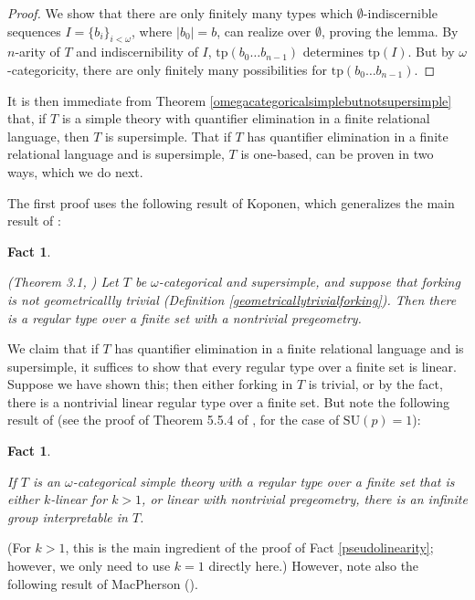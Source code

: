 \documentclass[11pt]{amsart}
\newtheorem{fact}[theorem]{Fact}
\theoremstyle{definition}
\theoremstyle{remark}
\numberwithin{equation}{section}
\begin{document}
\begin{proof}
We show that there are only finitely many types which $\emptyset$-indiscernible sequences $I = \{b_{i}\}_{i < \omega}$, where $|b_{0}| = b$, can realize over $\emptyset$, proving the lemma. By $n$-arity of $T$ and indiscernibility of $I$, $\mathrm{tp}(b_{0} \ldots b_{n-1})$ determines $\mathrm{tp}(I)$. But by $\omega$-categoricity, there are only finitely many possibilities for $\mathrm{tp}(b_{0} \ldots b_{n-1})$.

\end{proof}

It is then immediate from Theorem \ref{omegacategoricalsimplebutnotsupersimple} that, if $T$ is a simple theory with quantifier elimination in a finite relational language, then $T$ is supersimple. That if $T$ has quantifier elimination in a finite relational language and is supersimple, $T$ is one-based, can be proven in two ways, which we do next. 

The first proof uses the following result of Koponen, which generalizes the main result of \cite{HKP00}:

\begin{fact}\label{nontrivialregulartype} 

(Theorem 3.1, \cite{Kop19}) Let $T$ be $\omega$-categorical and supersimple, and suppose that forking is not geometricallly trivial (Definition \ref{geometricallytrivialforking}). Then there is a regular type over a finite set with a nontrivial pregeometry.
\end{fact}

We claim that if $T$ has quantifier elimination in a finite relational language and is supersimple, it suffices to show that every regular type over a finite set is linear. Suppose we have shown this; then either forking in $T$ is trivial, or by the fact, there is a nontrivial linear regular type over a finite set. But note the following result of \cite{TW03} (see the proof of Theorem 5.5.4 of \cite{Tomasic01}, for the case of $\mathrm{SU}(p)=1$):

\begin{fact}
    \label{linearitygroup}
    
    If $T$ is an $\omega$-categorical simple theory with a regular type over a finite set that is either $k$-linear for $k > 1$, or linear with nontrivial pregeometry, there is an infinite group interpretable in $T$.
\end{fact}
(For $k > 1$, this is the main ingredient of the proof of Fact \ref{pseudolinearity}; however, we only need to use $k=1$ directly here.) However, note also the following result of MacPherson (\cite{Mac91}).
\end{document}
